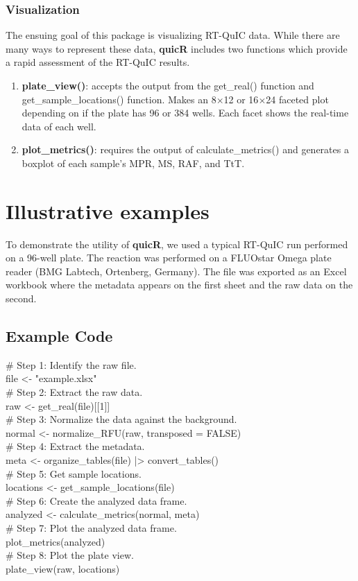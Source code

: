 \documentclass[preprint,12pt,a4paper]{elsarticle}
\begin{document}
        \subsubsection{Visualization}
            The ensuing goal of this package is visualizing RT-QuIC data. While there are many ways to represent these data, \textbf{quicR} includes two functions which provide a rapid assessment of the RT-QuIC results.
            \begin{enumerate}
                \item \textbf{plate\_view()}: accepts the output from the get\_real() function and get\_sample\_locations() function. Makes an 8$\times$12 or 16$\times$24 faceted plot depending on if the plate has 96 or 384 wells. Each facet shows the real-time data of each well.
                \item \textbf{plot\_metrics()}: requires the output of calculate\_metrics() and generates a boxplot of each sample's MPR, MS, RAF, and TtT.
            \end{enumerate}
        
    \section{Illustrative examples}
        To demonstrate the utility of \textbf{quicR}, we used a typical RT-QuIC run performed on a 96-well plate. The reaction was performed on a FLUOstar Omega plate reader (BMG Labtech, Ortenberg, Germany). The file was exported as an Excel workbook where the metadata appears on the first sheet and the raw data on the second.
        
        \subsection{Example Code}
            \# Step 1: Identify the raw file.\\
            file <- "example.xlsx"\\
            \# Step 2: Extract the raw data.\\
            raw <- get\_real(file)[[1]]\\
            \# Step 3: Normalize the data against the background.\\
            normal <- normalize\_RFU(raw, transposed = FALSE)\\
            \# Step 4: Extract the metadata.\\
            meta <- organize\_tables(file) |> convert\_tables()\\
            \# Step 5: Get sample locations.\\
            locations <- get\_sample\_locations(file)\\
            \# Step 6: Create the analyzed data frame.\\
            analyzed <- calculate\_metrics(normal, meta)\\
            \# Step 7: Plot the analyzed data frame.\\
            plot\_metrics(analyzed)\\
            \# Step 8: Plot the plate view.\\
            plate\_view(raw, locations)\\
\end{document}

